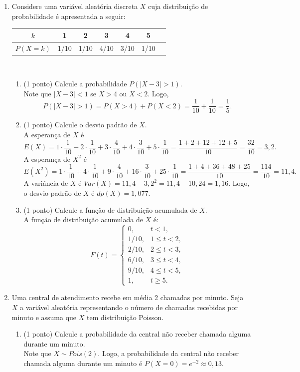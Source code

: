 \documentclass{article}
\begin{document}
\begin{enumerate}
% 
\item Considere uma variável aleatória discreta $X$ cuja distribuição de probabilidade é apresentada a seguir:
    \begin{center}
    \begin{tabular}{c|cccccc}
    \hline
    $k$ & 1 & 2 & 3 & 4 & 5 \\
    \hline
    $P(X=k)$ & 1/10 & 1/10 & 4/10 & 3/10 & 1/10 \\
    \hline
    \end{tabular}\\
    \end{center}
    \begin{enumerate}
    	\item (1 ponto) Calcule a probabilidade $P(|X-3|>1)$.\\
	{\color{blue}
	Note que $|X-3|<1$ se $X>4$ ou $X<2$. Logo,
	$$
	P(|X-3|>1) = P(X>4) + P(X<2) = \frac{1}{10} + \frac{1}{10} = \frac{1}{5}.
	$$
	}
	
    	\item (1 ponto) Calcule o desvio padrão de $X$.\\
	{\color{blue}
	A esperança de $X$ é
	$$
	E(X) = 1\cdot\frac{1}{10} + 2\cdot\frac{1}{10} + 3\cdot\frac{4}{10} + 4\cdot\frac{3}{10} + 5\cdot\frac{1}{10}
	= \frac{1 + 2 +12 + 12 + 5}{10} = \frac{32}{10} = 3,2.
	$$
	A esperança de $X^2$ é
	$$
	E(X^2) = 1\cdot\frac{1}{10} + 4\cdot\frac{1}{10} + 9\cdot\frac{4}{10} + 16\cdot\frac{3}{10} + 25\cdot\frac{1}{10}
	= \frac{1 + 4 + 36 + 48 + 25}{10} = \frac{114}{10} = 11,4.
	$$
	A variância de $X$ é $Var(X) = 11,4 - 3,2^2 = 11,4 - 10,24 = 1,16$. Logo, o desvio padrão de $X$ é $dp(X) = 1,077$.
	}
	
    	\item (1 ponto) Calcule a função de distribuição acumulada de $X$.\\
	{\color{blue}
	A função de distribuição acumulada de $X$ é:
	$$
	F(t) = \begin{cases}
	0, & t<1, \\
	1/10, & 1\leq t<2, \\
	2/10, & 2\leq t<3, \\
	6/10, & 3\leq t<4, \\
	9/10, & 4\leq t<5, \\
	1, & t \geq 5 .
	\end{cases}
	$$
	}
    \end{enumerate}

\item Uma central de atendimento recebe em média 2 chamadas por minuto. Seja $X$ a variável aleatória representando o número de chamadas recebidas por minuto e assuma que $X$ tem distribuição Poisson. 
\begin{enumerate}
	\item (1 ponto) Calcule a probabilidade da central não receber chamada alguma durante um minuto.\\
	{\color{blue}
	Note que $X \sim Pois(2)$. Logo, a probabilidade da central não receber chamada alguma durante um minuto é $P(X=0) = e^{-2} \approx 0,13$.
	}
	

\end{enumerate}
\end{enumerate}
\end{document}
